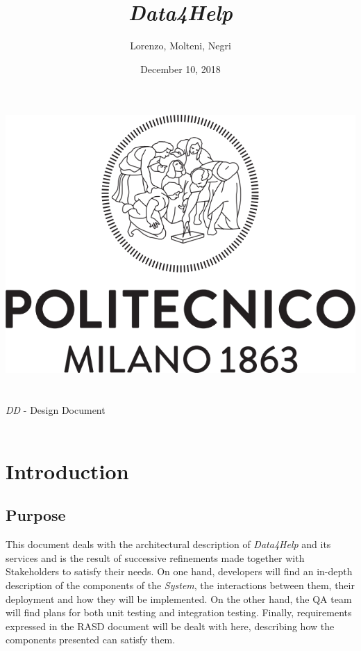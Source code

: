 \documentclass[titlepage]{article}
\title{{\Huge {\it {\it Data4Help}}}}
\author{Lorenzo, Molteni, Negri}
\date{December 10, 2018}
\begin{document}
\makeatletter
    \begin{titlepage}
        \begin{center}
            \includegraphics[width=\linewidth]{logo.png}\\[20ex]
            {\huge  \@title }\\[2ex] 
            {\LARGE  \@author}\\[3ex] 
            {\LARGE {\it DD} - Design Document}\\[3ex]
            {\large \@date}\\[5ex]
        \end{center}
    \end{titlepage}
\makeatother
\thispagestyle{empty}
\newpage

\thispagestyle{empty}
\newpage


	
\pagebreak
\tableofcontents{}
\pagebreak

\section{Introduction}
\subsection{Purpose}
This document deals with the architectural description of {\it Data4Help} and its services and is the result of successive refinements made together with Stakeholders to satisfy their needs.
On one hand, developers will find an in-depth description of the components of the {\it System}, the interactions between them, their deployment and how they will be implemented.
On the other hand, the QA team will find plans for both unit testing and integration testing.
Finally, requirements expressed in the RASD document will be dealt with here, describing how the components presented can satisfy them.
\end{document}
